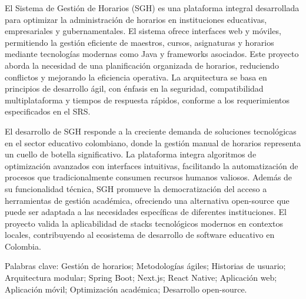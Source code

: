 El Sistema de Gestión de Horarios (SGH) es una plataforma integral desarrollada para optimizar la administración de horarios en instituciones educativas, empresariales y gubernamentales. El sistema ofrece interfaces web y móviles, permitiendo la gestión eficiente de maestros, cursos, asignaturas y horarios mediante tecnologías modernas como Java y frameworks asociados. Este proyecto aborda la necesidad de una planificación organizada de horarios, reduciendo conflictos y mejorando la eficiencia operativa. La arquitectura se basa en principios de desarrollo ágil, con énfasis en la seguridad, compatibilidad multiplataforma y tiempos de respuesta rápidos, conforme a los requerimientos especificados en el SRS.

El desarrollo de SGH responde a la creciente demanda de soluciones tecnológicas en el sector educativo colombiano, donde la gestión manual de horarios representa un cuello de botella significativo. La plataforma integra algoritmos de optimización avanzados con interfaces intuitivas, facilitando la automatización de procesos que tradicionalmente consumen recursos humanos valiosos. Además de su funcionalidad técnica, SGH promueve la democratización del acceso a herramientas de gestión académica, ofreciendo una alternativa open-source que puede ser adaptada a las necesidades específicas de diferentes instituciones. El proyecto valida la aplicabilidad de stacks tecnológicos modernos en contextos locales, contribuyendo al ecosistema de desarrollo de software educativo en Colombia.

Palabras clave: Gestión de horarios; Metodologías ágiles; Historias de usuario; Arquitectura modular; Spring Boot; Next.js; React Native; Aplicación web; Aplicación móvil; Optimización académica; Desarrollo open-source.